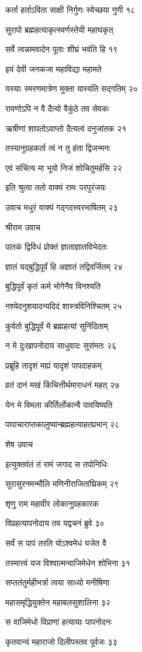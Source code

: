 कर्ता हर्ताऽविता साक्षी निर्गुणः स्वेच्छया गुणी १८

सुरापो ब्रह्महत्याकृत्स्वर्णस्तेयी महाघकृत्

सर्वे त्वन्नामवादेन पूताः शीघ्रं भवंति हि १९

इयं देवी जनकजा महाविद्या महामते

यस्याः स्मरणमात्रेण मुक्ता यास्यंति सद्गतिम् २०

रावणोऽपि न वै दैत्यो वैकुंठे तव सेवकः

ऋषीणां शापतोऽवाप्तो दैत्यत्वं दनुजांतक २१

तस्यानुग्रहकर्ता त्वं न तु हंता द्विजन्मनः

एवं संचिंत्य मा भूयो निजं शोचितुमर्हसि २२

इति श्रुत्वा ततो वाक्यं रामः परपुरंजयः

उवाच मधुरं वाक्यं गद्गदस्वरभाषितम् २३

श्रीराम उवाच

पातकं द्विविधं प्रोक्तं ज्ञाताज्ञातविभेदतः

ज्ञातं यद्बुद्धिपूर्वं हि अज्ञातं तद्विवर्जितम् २४

बुद्धिपूर्वं कृतं कर्म भोगेनैव विनश्यति

नश्येदनुशयादन्यदिदं शास्त्रविनिश्चितम् २५

कुर्वतो बुद्धिपूर्वं मे ब्रह्महत्यां सुनिंदिताम्

न मे दुःखापनोदाय साधुवादः सुसंमतः २६

प्रब्रूहि तादृशं मह्यं यादृशं पापदाहकम्

व्रतं दानं मखं किंचित्तीर्थमाराधनं महत् २७

येन मे विमला कीर्तिर्लोकान्वै पावयिष्यति

पापाचाराप्तकालुष्यान्ब्रह्महत्याहतप्रभान् २८

शेष उवाच

इत्युक्तवंतं तं रामं जगाद स तपोनिधिः

सुरासुरनमन्मौलि मणिनीराजितांघ्रिकम् २९

शृणु राम महावीर लोकानुग्रहकारक

विप्रहत्यापनोदाय तव यद्वचनं ब्रुवे ३०

सर्वं स पापं तरति योऽश्वमेधं यजेत वै

तस्मात्त्वं यज विश्वात्मन्वाजिमेधेन शोभिना ३१

सप्ततंतुर्महीभर्त्रा त्वया साध्यो मनीषिणा

महासमृद्धियुक्तेन महाबलसुशालिना ३२

स वाजिमेधो विप्राणां हत्यायाः पापनोदनः

कृतवान्यं महाराजो दिलीपस्तव पूर्वजः ३३

